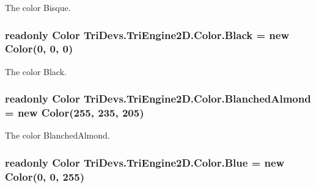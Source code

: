 The color Bisque. 

\hypertarget{struct_tri_devs_1_1_tri_engine2_d_1_1_color_a7f40a7f2300ec92cfe41f83839096cd4}{
\subsubsection[{Black}]{\setlength{\rightskip}{0pt plus 5cm}readonly {\bf Color} Tri\-Devs.\-Tri\-Engine2\-D.\-Color.\-Black = new {\bf Color}(0, 0, 0)\hspace{0.3cm}{\ttfamily [static]}}}\label{struct_tri_devs_1_1_tri_engine2_d_1_1_color_a7f40a7f2300ec92cfe41f83839096cd4}


The color Black. 

\hypertarget{struct_tri_devs_1_1_tri_engine2_d_1_1_color_a7ccf784215d78fc0557889d076252701}{
\subsubsection[{Blanched\-Almond}]{\setlength{\rightskip}{0pt plus 5cm}readonly {\bf Color} Tri\-Devs.\-Tri\-Engine2\-D.\-Color.\-Blanched\-Almond = new {\bf Color}(255, 235, 205)\hspace{0.3cm}{\ttfamily [static]}}}\label{struct_tri_devs_1_1_tri_engine2_d_1_1_color_a7ccf784215d78fc0557889d076252701}


The color Blanched\-Almond. 

\hypertarget{struct_tri_devs_1_1_tri_engine2_d_1_1_color_ae83a5b50e83a01a3d31018292c0d0cb4}{
\subsubsection[{Blue}]{\setlength{\rightskip}{0pt plus 5cm}readonly {\bf Color} Tri\-Devs.\-Tri\-Engine2\-D.\-Color.\-Blue = new {\bf Color}(0, 0, 255)\hspace{0.3cm}{\ttfamily [static]}}}\label{struct_tri_devs_1_1_tri_engine2_d_1_1_color_ae83a5b50e83a01a3d31018292c0d0cb4}


